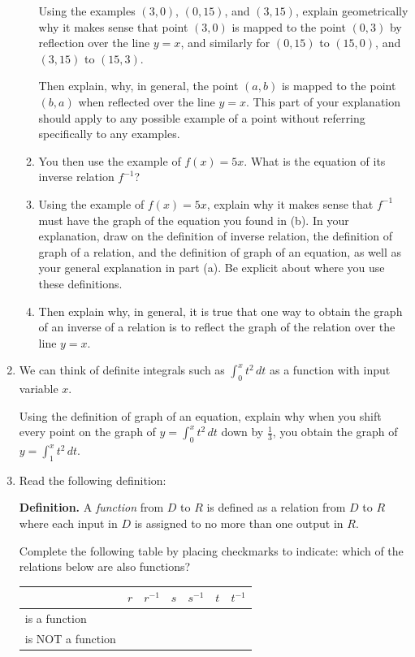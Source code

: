 \documentclass[11pt]{article}
\theoremstyle{definition}
\begin{document}
\begin{enumerate}[resume]
\begin{enumerate}
	 Using the examples $(3,0)$, $(0,15)$, and $(3,15)$, explain geometrically why it makes sense that point $(3,0)$ is mapped to the point $(0,3)$ by reflection over the line $y=x$, and similarly for $(0, 15)$ to $(15,0)$, and $(3, 15)$ to $(15, 3)$.
	 
	 Then explain, why, in general, the point $(a,b)$ is mapped to the point $(b,a)$ when reflected over the line $y=x$. This part of your explanation should apply to any possible example of a point without referring specifically to any examples.

	\item You then use the example of $f(x)=5x$. What is the equation of its inverse relation $f^{-1}$?
	
	\item Using the example of $f(x)=5x$, explain why it makes sense that  $f^{-1}$ must have the graph of the equation you found in (b). In your explanation, draw on the definition of inverse relation, the definition of graph of a relation, and the definition of graph of an equation, as well as your general explanation in part (a). Be explicit about where you use these definitions.
	
	\item Then explain why, in general, it is true that one way to obtain the graph of an inverse of a relation is to reflect the graph of the relation over the line $y=x$. 
	\end{enumerate}
		
\item 
We can think of definite integrals such as $\int_{0}^{x} t^2 \,dt$ as a function with input variable $x$.  

Using the definition of graph of an equation, explain why when you shift every point on the graph of $y=\int_{0}^{x} t^2 \,dt$ down by $\frac{1}{3}$, you obtain the graph of $y=\int_{1}^{x} t^2 \,dt$.

\item 
\label{h: function definition}
Read the following definition:

{\bf Definition.} A {\it function} from $D$ to $R$ is defined as a relation from $D$ to $R$ where each input in $D$ is assigned to no more than one output in $R$.

Complete the following table by placing checkmarks to indicate: which of the relations below are also functions?

\begin{center}
\begin{tabular}{C{1in}|C{0.5in}|C{0.5in}|C{0.5in}|C{0.5in}|C{0.5in}|C{0.5in}|}
	& $r$ & $r^{-1}$ & $s$ & $s^{-1}$ & $t$ & $t^{-1}$ \\ \hline
is a function & &&&&& \\ \hline
is NOT a function &&&&&& \\ \hline 
\end{tabular}
\end{center}
\end{enumerate}
\end{document}
